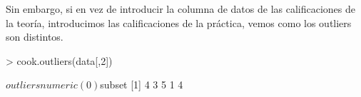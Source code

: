 \documentclass [a4paper] {article}
\begin{document}
\bigskip
Sin embargo, si en vez de introducir la columna de datos de las calificaciones de la teoría, introducimos
las calificaciones de la práctica, vemos como los outliers son distintos.
\begin{Schunk}
\begin{Sinput}
> cook.outliers(data[,2])
\end{Sinput}
\begin{Soutput}
$outliers
numeric(0)

$subset
[1] 4 3 5 1 4
\end{Soutput}
\end{Schunk}
\end{document}

